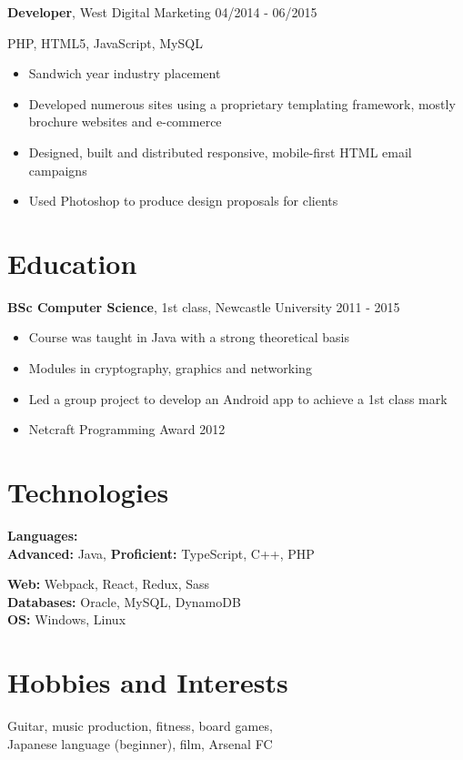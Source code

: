 \documentclass{article}
\begin{document}
\begin{minipage}[t]{0.35\linewidth}
\textbf{Developer}, West Digital Marketing \hfill 04/2014 - 06/2015

\vspace{0.3cm}PHP, HTML5, JavaScript, MySQL

\vspace{0.3cm}
\begin{itemize}
  \item Sandwich year industry placement
  \item Developed numerous sites using a proprietary templating framework, mostly brochure websites and e-commerce
  \item Designed, built and distributed responsive, mobile-first HTML email campaigns
  \item Used Photoshop to produce design proposals for clients
\end{itemize}

\section*{Education}
\textbf{BSc Computer Science}, 1st class, Newcastle University
2011 - 2015

\vspace{0.3cm}
\begin{itemize}
  \item Course was taught in Java with a strong theoretical basis
  \item Modules in cryptography, graphics and networking
  \item Led a group project to develop an Android app to achieve a 1st class mark
  \item Netcraft Programming Award 2012
\end{itemize}

\section*{Technologies}

\textbf{Languages:}\\
\textbf{Advanced:} Java, \textbf{Proficient:} TypeScript, C++, PHP

\textbf{Web:} Webpack, React, Redux, Sass\\
\textbf{Databases:} Oracle, MySQL, DynamoDB\\
\textbf{OS:} Windows, Linux

\section*{Hobbies and Interests}

Guitar, music production, fitness, board games,
\\Japanese language (beginner), film, Arsenal FC

\end{minipage}
\end{document}
